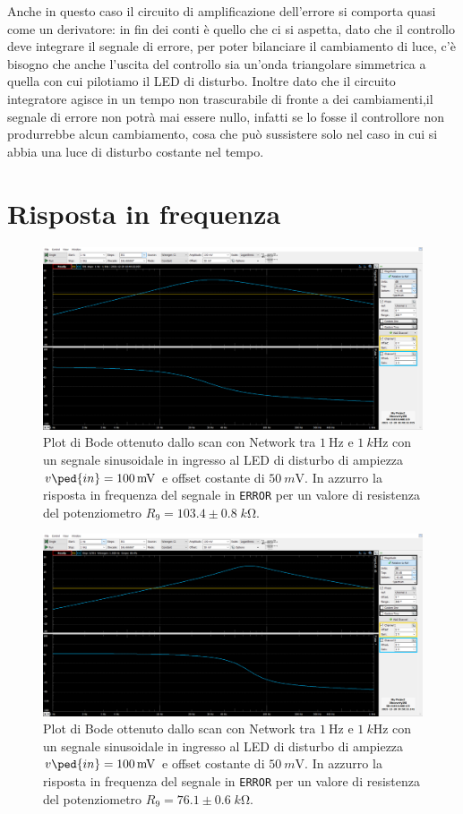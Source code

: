 \documentclass[10pt, a4paper, italian]{article}
\begin{document}
Anche in questo caso il circuito di amplificazione dell'errore si comporta quasi come un derivatore: in fin dei conti è quello che ci si aspetta, dato che il controllo deve integrare il segnale di errore, per poter bilanciare il cambiamento di luce, c'è bisogno che anche l'uscita del controllo sia un'onda triangolare simmetrica a quella con cui pilotiamo il LED di disturbo. Inoltre dato che il circuito integratore agisce in un tempo non trascurabile di fronte a dei cambiamenti,il segnale di errore non potrà mai essere nullo, infatti se lo fosse il controllore non produrrebbe alcun cambiamento, cosa che può sussistere solo nel caso in cui si abbia una luce di disturbo costante nel tempo.

\section{Risposta in frequenza}
\begin{figure}[htbp]
    \centering
	\includegraphics[width=\textwidth]{103.4k}
    \caption{Plot di Bode ottenuto dallo scan con Network tra $\SI{1}{\Hz}$ e
	$\SI{1}{k\Hz}$ con un segnale sinusoidale in ingresso al LED di disturbo di
	ampiezza $v\ped{in} = \SI{100}{m\V}$ e offset costante di $\SI{50}{m\V}$.
	In azzurro la risposta in frequenza del segnale in \texttt{ERROR} per un
	valore di resistenza del potenziometro $R_9 = 103.4 \pm 0.8 \; \si{k\ohm}$.
    \label{fig: netR103}}
\end{figure}
\begin{figure}[htbp]
    \centering
	\includegraphics[width=\textwidth]{76.1k}
    \caption{Plot di Bode ottenuto dallo scan con Network tra $\SI{1}{\Hz}$ e
	$\SI{1}{k\Hz}$ con un segnale sinusoidale in ingresso al LED di disturbo di
	ampiezza $v\ped{in} = \SI{100}{m\V}$ e offset costante di $\SI{50}{m\V}$.
	In azzurro la risposta in frequenza del segnale in \texttt{ERROR} per un
	valore di resistenza del potenziometro $R_9 = 76.1 \pm 0.6 \; \si{k\ohm}$.
    \label{fig: netR76}}
\end{figure}
\end{document}
